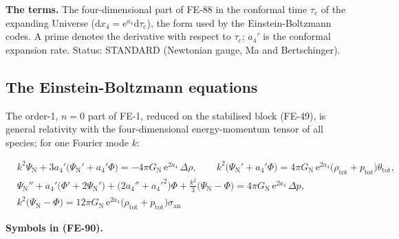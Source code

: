 \documentclass[
  10pt,
]{article}
\begin{document}
\textbf{The terms.} The four-dimensional part of FE-88 in the conformal
time \(\tau_{\mathrm{c}}\) of the expanding Universe
(\(\mathrm{d}x_4 = \mathrm{e}^{a_4}\mathrm{d}\tau_{\mathrm{c}}\)), the
form used by the Einstein-Boltzmann codes. A prime denotes the
derivative with respect to \(\tau_{\mathrm{c}}\); \(a_4'\) is the
conformal expansion rate. Status: STANDARD (Newtonian gauge, Ma and
Bertschinger).

\hypertarget{the-einstein-boltzmann-equations}{%
\subsection{The Einstein-Boltzmann
equations}\label{the-einstein-boltzmann-equations}}

The order-1, \(n = 0\) part of FE-1, reduced on the stabilised block
(FE-49), is general relativity with the four-dimensional energy-momentum
tensor of all species; for one Fourier mode \(k\):

\[
\begin{aligned}
&k^2\Psi_{\mathrm{N}} + 3a_4'\big(\Psi_{\mathrm{N}}' + a_4'\Phi\big) = -4\pi
 G_{\mathrm{N}}\,\mathrm{e}^{2a_4}\,\Delta\rho,\qquad
 k^2\big(\Psi_{\mathrm{N}}' + a_4'\Phi\big) = 4\pi
 G_{\mathrm{N}}\,\mathrm{e}^{2a_4}\big(\rho_{\mathrm{tot}} + p_{\mathrm{tot}}\big)\theta_{\mathrm{tot}},\\
&\Psi_{\mathrm{N}}'' + a_4'\big(\Phi' + 2\Psi_{\mathrm{N}}'\big) + \big(2a_4'' + a_4'^2\big)\Phi +
 \frac{k^2}{3}\big(\Psi_{\mathrm{N}} - \Phi\big)
 = 4\pi G_{\mathrm{N}}\,\mathrm{e}^{2a_4}\,\Delta p,\\
&k^2\big(\Psi_{\mathrm{N}} - \Phi\big) = 12\pi G_{\mathrm{N}}\,\mathrm{e}^{2a_4}\big(\rho_{\mathrm{tot}}
 + p_{\mathrm{tot}}\big)\sigma_{\mathrm{an}}
\end{aligned} \tag{FE-90}
\]

\textbf{Symbols in (FE-90).}
\end{document}
